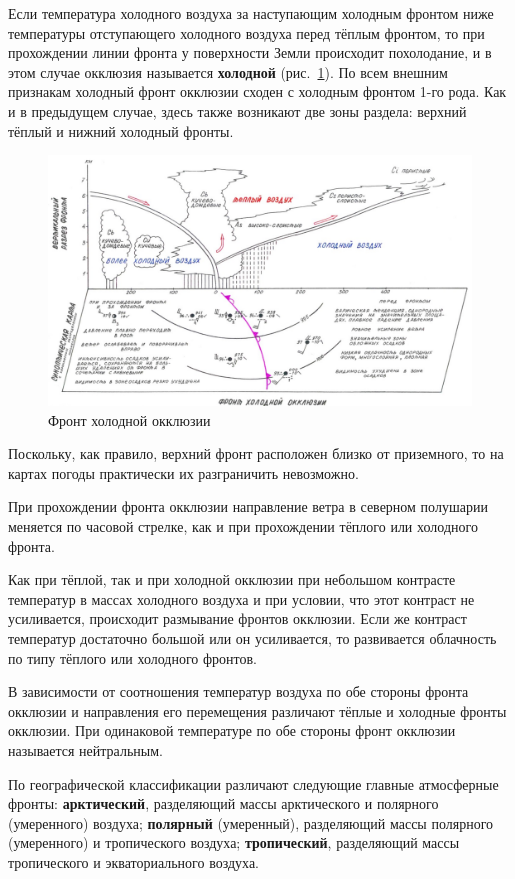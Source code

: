 \documentclass[a4paper, 12pt, twoside, final, book, russian, fittopage, cyremdash, openright]{ncc}
\begin{document}
Если температура холодного воздуха за наступающим холодным фронтом
ниже температуры отступающего холодного воздуха перед тёплым фронтом,
то при прохождении линии фронта у поверхности Земли происходит
похолодание, и в этом случае окклюзия называется \textbf{холодной}
(рис.~\ref{fig:09_cold_ocl_front}). По всем внешним признакам холодный
фронт окклюзии сходен с холодным фронтом 1-го рода. Как и в предыдущем
случае, здесь также возникают две зоны раздела: верхний тёплый и
нижний холодный фронты.

\begin{figure}[htb]
   \centering
   \includegraphics[scale=0.7]{09_cold_ocl_front.pdf}
   \caption{Фронт холодной окклюзии}
   \label{fig:09_cold_ocl_front}
\end{figure}

Поскольку, как правило, верхний фронт расположен близко от приземного,
то на картах погоды практически их разграничить невозможно.

При прохождении фронта окклюзии направление ветра в северном полушарии
меняется по часовой стрелке, как и при прохождении тёплого или
холодного фронта.

Как при тёплой, так и при холодной окклюзии при небольшом контрасте
температур в массах холодного воздуха и при условии, что этот контраст
не усиливается, происходит размывание фронтов окклюзии. Если же
контраст температур достаточно большой или он усиливается, то
развивается облачность по типу тёплого или холодного фронтов.

В зависимости от соотношения температур воздуха по обе стороны фронта
окклюзии и направления его перемещения различают тёплые и холодные
фронты окклюзии. При одинаковой температуре по обе стороны фронт
окклюзии называется нейтральным.

По географической классификации различают следующие главные атмосферные фронты:
\textbf{арктический}, разделяющий массы арктического и полярного (умеренного) воздуха;
\textbf{полярный} (умеренный), разделяющий массы полярного (умеренного) и тропического воздуха;
\textbf{тропический}, разделяющий массы тропического и экваториального воздуха.
\end{document}
